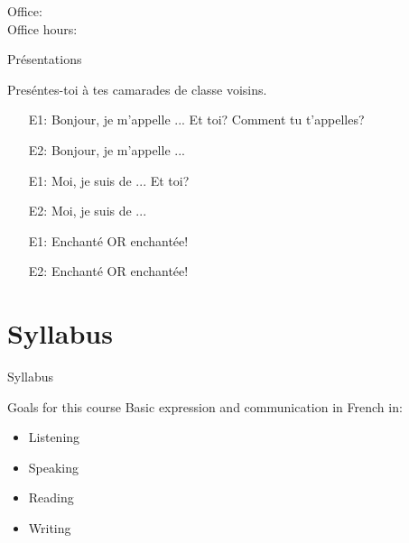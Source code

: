 \documentclass{beamer}
\subtitle[Bienvenue]{Bienvenue}
\begin{document}
  \begin{frame}
    \titlepage
    \tiny{Office: \\
          Office hours: }
  \end{frame}

  \begin{frame}{Présentations}
    \begin{center}
      Preséntes-toi à tes camarades de classe voisins.
    \end{center}
    \begin{itemize}
      \item[E1:] Bonjour, je m'appelle ... Et toi? Comment tu t'appelles?
      \item[E2:] Bonjour, je m'appelle ...
      \item[E1:] Moi, je suis de ... Et toi?
      \item[E2:] Moi, je suis de ...
      \item[E1:] Enchanté OR enchantée!
      \item[E2:] Enchanté OR enchantée!
    \end{itemize}
  \end{frame}

  \section{Syllabus}
  \begin{frame}
    \begin{center}
      \Huge{Syllabus}
    \end{center}
  \end{frame}

  \begin{frame}{Goals for this course}
    Basic expression and communication in French in:
    \begin{itemize}
      \item Listening
      \item Speaking
      \item Reading
      \item Writing
    \end{itemize}
  \end{frame}
\end{document}
